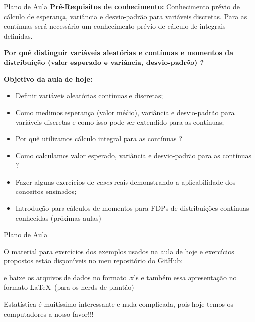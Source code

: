 \documentclass{beamer}
\begin{document}
\begin{frame}{Plano de Aula}
\vspace{-.5cm}
\footnotesize
\textbf{Pré-Requisitos de conhecimento:} Conhecimento prévio de cálculo de esperança, variância e desvio-padrão para variáveis discretas. Para as contínuas será necessário um conhecimento prévio de cálculo de integrais definidas. 

\textbf{Por quê distinguir variáveis aleatórias e contínuas e momentos da distribuição (valor esperado e variância, desvio-padrão) ?}

\textbf{Objetivo da aula de hoje:}

    \begin{itemize}
        \item Definir variáveis aleatórias contínuas e discretas;
        \item Como medimos esperança (valor médio), variância e desvio-padrão para variáveis discretas e como isso pode ser extendido para as contínuas;
        \item Por quê utilizamos cálculo integral para as contínuas ?
        \item Como calculamos valor esperado, variância e desvio-padrão para as contínuas ?
        \item Fazer alguns exercícios de \textit{cases} reais demonstrando a aplicabilidade dos conceitos ensinados;
        \item Introdução para cálculos de momentos para FDPs de distribuições contínuas conhecidas (próximas aulas)
    \end{itemize}
    

\end{frame}
\begin{frame}{Plano de Aula}
    
O material para exercícios dos exemplos usados na aula de hoje e exercícios propostos estão disponíveis no meu repositório do GitHub:

\vspace{.5cm}
 e baixe os arquivos de dados no formato .xls e também essa apresentação no formato \LaTeX\, (para os nerds de plantão)



\vspace{.5cm}
Estatística é muitíssimo interessante e nada complicada, pois hoje temos os computadores a nosso favor!!!
        
    
\end{frame}
\end{document}
